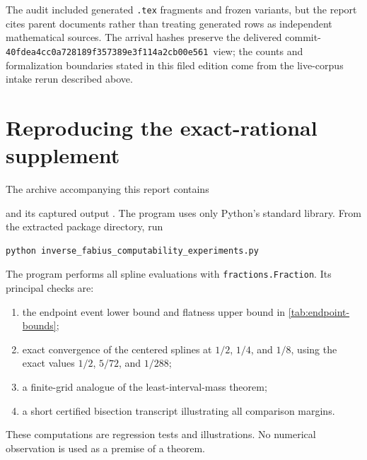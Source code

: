 \documentclass[11pt,oneside]{article}
\theoremstyle{definition}
\theoremstyle{remark}
\numberwithin{equation}{section}
\newcommand{\arrivalcommit}{\nolinkurl{40fdea4cc0a728189f357389e3f114a2cb00e561}}
\begin{document}
The audit included generated \texttt{.tex} fragments and frozen variants, but
the report cites parent documents rather than treating generated rows as
independent mathematical sources.  The arrival hashes preserve the delivered
commit-\arrivalcommit\ view; the counts and formalization boundaries stated in
this filed edition come from the live-corpus intake rerun described above.

\section{Reproducing the exact-rational supplement}
\label{app:reproduction}

The archive accompanying this report contains
\begin{center}
\end{center}
and its captured output .  The program uses only
Python's standard library.  From the extracted package directory, run

\begin{lstlisting}[style=reportpseudo,language={}]
python inverse_fabius_computability_experiments.py
\end{lstlisting}

The program performs all spline evaluations with
\texttt{fractions.Fraction}.  Its principal checks are:

\begin{enumerate}
\item the endpoint event lower bound and flatness upper bound in
      \cref{tab:endpoint-bounds};
\item exact convergence of the centered splines at $1/2$, $1/4$, and $1/8$,
      using the exact values $1/2$, $5/72$, and $1/288$;
\item a finite-grid analogue of the least-interval-mass theorem;
\item a short certified bisection transcript illustrating all comparison
      margins.
\end{enumerate}

These computations are regression tests and illustrations.  No numerical
observation is used as a premise of a theorem.
\end{document}
